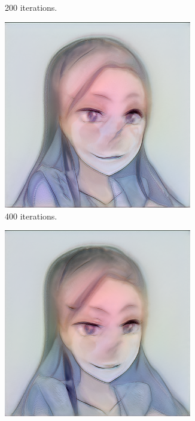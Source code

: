 \documentclass[conference]{IEEEtran}
\theoremstyle{definition}
\theoremstyle{remark}
\theoremstyle{remark}
\begin{document}
\begin{figure}
\begin{subfigure}[b]{0.15\textwidth}
    \caption{200 iterations.}
  \end{subfigure}
  \begin{subfigure}[b]{0.15\textwidth}
    \centering \includegraphics[width=0.9\textwidth]{figs/anime-deipols-2.png}
    \caption{400 iterations.}
  \end{subfigure}
  \begin{subfigure}[b]{0.15\textwidth}
    \centering \includegraphics[width=0.9\textwidth]{figs/anime-deipols-3.png}

\end{subfigure}
\end{figure}
\end{document}
